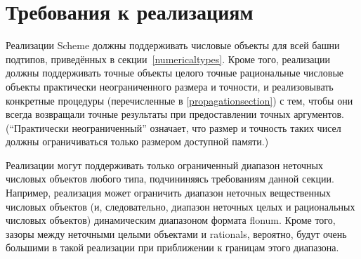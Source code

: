 \section{Требования к реализациям}

\label{restrictions}

Реализации Scheme должны поддерживать числовые объекты для всей башни подтипов, приведённых в
секции~\ref{numericaltypes}. Кроме того, реализации должны поддерживать точные объекты целого
точные рациональные числовые объекты практически неограниченного размера и точности,
и реализовывать конкретные процедуры (перечисленные в \ref{propagationsection}) с тем, чтобы
они всегда возвращали точные результаты при предоставлении точных аргументов. (``Практически
неограниченный'' означает, что размер и точность таких чисел должны
ограничиваться только размером доступной памяти.)


Реализации могут поддерживать только ограниченный диапазон неточных числовых объектов любого
типа, подчининяясь требованиям данной секции. Например, реализация может ограничить диапазон
неточных вещественных числовых объектов (и, следовательно, диапазон неточных целых и
рациональных числовых объектов) динамическим диапазоном формата flonum. Кроме того, зазоры
между неточными целыми объектами и rationals, вероятно, будут очень большими в такой
реализации при приближении к границам этого диапазона.

